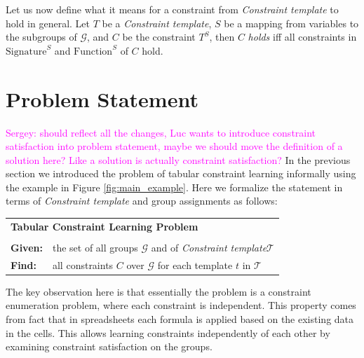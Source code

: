 \documentclass{ecai}
\newcommand{\sergey}[1]{\textcolor{magenta}{{\sc Sergey:} #1}\xspace}
\newcommand{\constraints}{\ensuremath{\mathcal{T}}\xspace}
\newcommand{\format}[1]{\textit{#1}\xspace}
\newcommand{\template}{\format{Constraint template}}
\newcommand{\CSignature}{Signature\xspace}
\newcommand{\CFunction}{Function\xspace}
\newcommand{\groups}{\ensuremath{\mathcal{G}}\xspace}
\begin{document}
Let us now define what it means for a constraint from \template to hold in general. Let $T$ be a \template, $S$ be a mapping from variables to the subgroups of \groups, and $C$ be the constraint $T^S$, then $C$ \textit{holds} iff all constraints in $\text{\CSignature}^S$ and $\text{\CFunction}^S$ of $C$ hold.



\section{Problem Statement}
\sergey{should reflect all the changes, Luc wants to introduce constraint satisfaction into problem statement, maybe we should move the definition of a solution here? Like a solution is actually constraint satisfaction?}
In the previous section we introduced the problem of tabular constraint learning informally using the example in Figure \ref{fig:main_example}. Here we formalize the statement in terms of \template and group assignments as follows: 

\begin{minipage}[c]{14em}
  \vspace{5pt}
  \begin{tabular}{ll}
    \multicolumn{2}{l}{{\textbf{Tabular Constraint Learning Problem}}}\\
    \vspace{-4pt}
    &\\
    \textbf{Given:}& the set of all groups $\groups$ and of \template $\constraints$\\
    \textbf{Find:}&  all constraints $C$ over \groups for each template $t$ in \constraints \\
  \end{tabular}
  \vspace{6pt}
\end{minipage}

  The key observation here is that essentially the problem is a constraint enumeration problem, where each constraint is independent. This property comes from fact that in spreadsheets each formula is applied based on the existing data in the cells. This allows learning constraints independently of each other by examining constraint satisfaction on the groups.
\end{document}
